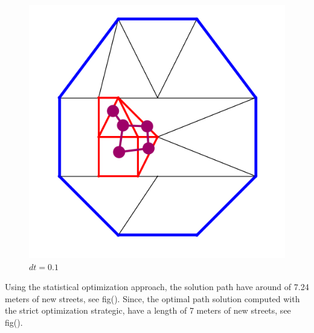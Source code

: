 \documentclass[10pt]{article}
\begin{document}
\begin{figure}[H]
\begin{minipage}{.33\linewidth}
        \caption{$dt=0.1$}
        \label{fig:prob1_6_2}
    \end{minipage}%
    \begin{minipage}{.33\linewidth}
        \centering
        \includegraphics[width=1\textwidth]{images/dual4.png}
        \caption{$dt=0.1$}
        \label{fig:prob1_6_2}
    \end{minipage}
\end{figure}
Using the statistical optimization approach, the solution path have around of 7.24 meters of new streets, see fig(). Since, the optimal path solution computed with the strict optimization strategic, have a length of 7 meters of new streets, see fig(). 
\end{document}
